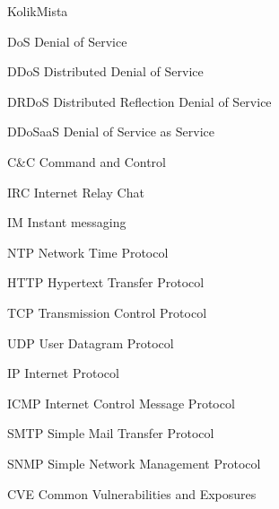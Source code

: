 \begin{seznamzkratek}{KolikMista}

		{DoS}
		{Denial of Service}

		{DDoS}
		{Distributed Denial of Service}

		{DRDoS}
		{Distributed Reflection Denial of Service}

		{DDoSaaS}
		{Denial of Service as Service}

		{C\&C} %
		{Command and Control}

		{IRC}
		{Internet Relay Chat}

		{IM}
		{Instant messaging}

		{NTP}
		{Network Time Protocol}

		{HTTP}
		{Hypertext Transfer Protocol}

		{TCP}
		{Transmission Control Protocol}

		{UDP}
		{User Datagram Protocol}

		{IP}
		{Internet Protocol}

		{ICMP}
		{Internet Control Message Protocol}

		{SMTP}
		{Simple Mail Transfer Protocol}
		
		{SNMP}
		{Simple Network Management Protocol}
	
		{CVE}
		{Common Vulnerabilities and Exposures}
\end{seznamzkratek}
